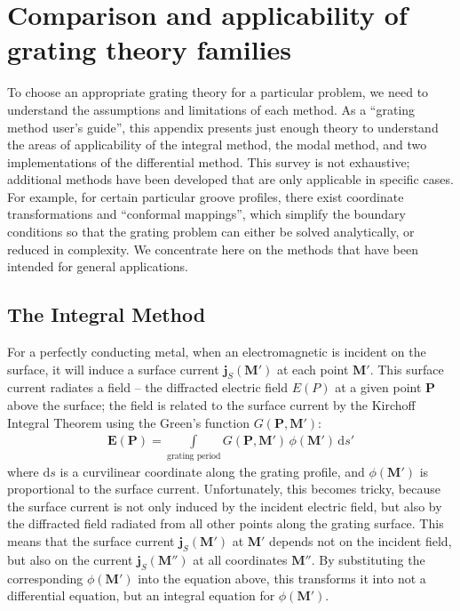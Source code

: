 \documentclass[singlespace,proposal]{uofsthesis-cs}
\newcommand{\dif}{\mathrm{d}}
\begin{document}
\chapter{Comparison and applicability of\\grating theory families}
\label{methodComparison}
To choose an appropriate grating theory for a particular problem, we need to understand the assumptions and limitations of each method.  As a ``grating method user's guide'', this appendix presents just enough theory to understand the areas of applicability of the integral method, the modal method, and two implementations of the differential method.  This survey is not exhaustive; additional methods have been developed that are only applicable in specific cases.  For example, for certain particular groove profiles, there exist coordinate transformations and ``conformal mappings'', which simplify the boundary conditions so that the grating problem can either be solved analytically, or reduced in complexity.  We concentrate here on the methods that have been intended for general applications.
\section{The Integral Method}
For a perfectly conducting metal, when an electromagnetic is incident on the surface, it will induce a surface current $\mathbf{j}_S(\mathbf{M}')$ at each point $\mathbf{M}'$.  This surface current radiates a field -- the diffracted electric field $E(P)$ at a given point $\mathbf{P}$ above the surface; the field is related to the surface current by the Kirchoff Integral Theorem \cite{Kir83} using the Green's function $G(\mathbf{P}, \mathbf{M}')$:
\begin{eqnarray}
\mathbf{E}(\mathbf{P}) = \int\limits_{\textrm{grating period}} G(\mathbf{P}, \mathbf{M}')\, \phi(\mathbf{M}')\, \dif s'
\end{eqnarray}
where $\dif s$ is a curvilinear coordinate along the grating profile, and $\phi(\mathbf{M'})$ is proportional to the surface current.  Unfortunately, this becomes tricky, because the surface current is not only induced by the incident electric field, but also by the diffracted field radiated from all other points along the grating surface.  This means that the surface current $\mathbf{j}_S(\mathbf{M}')$ at $\mathbf{M}'$ depends not on the incident field, but also on the current $\mathbf{j}_S(\mathbf{M}'')$ at all coordinates $\mathbf{M}''$.  By substituting the corresponding $\phi(\mathbf{M'})$ into the equation above, this transforms it into not a differential equation, but an integral equation for $\phi(\mathbf{M'})$.  
\end{document}
